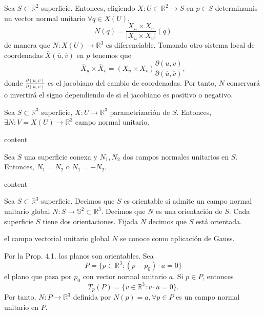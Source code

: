 \begin{note}
  Sea $S \subset \mathbb{R}^{2}$ superficie. Entonces, eligiendo $X : U \subset \mathbb{R}^{2} \to S$ en $p \in S$ determinamis un vector normal unitario $\forall q \in X(U)$,
  \[ 
    N(q) = \frac{X_{u} \times X_{v}}{| X_{u} \times X_{v} |}(q)
  \] 
  de manera que $N : X(U) \to \mathbb{R}^{3}$ es diferenciable. Tomando otro sistema local de coordenadas $\overline{X}(\overline{u}, \overline{v})$ en $p$ tenemos que
  \[ 
    \overline{X}_{\overline{u}} \times \overline{X}_{\overline{v}} = (X_{u} \times X_{v}) \frac{\partial{(u, v)}}{\partial{(\overline{u}, \overline{v})}},
  \] 
  donde $\frac{\partial{(u, v)}}{\partial{(\overline{u}, \overline{v})}}$ es el jacobiano del cambio de coordenadas. Por tanto, $N$ conservará o invertirá el signo dependiendo de si el jacobiano es positivo o negativo.
\end{note}

\begin{prop}
  Sea $S \subset \mathbb{R}^{3}$ superficie, $X : U \to \mathbb{R}^{3}$ parametrización de $S$. Entonces, $\exists N : V = X(U) \to \mathbb{R}^{3}$ campo normal unitario.
\end{prop}

\begin{dem}
  content
\end{dem}

\begin{lem}
  Sea $S$ una superficie conexa y $N_{1}, N_{2}$ dos campos normales unitarios en $S$. Entonces, $N_{1} = N_{2}$ o $N_{1} = -N_{2}$.
\end{lem}

\begin{dem}
  content
\end{dem}

\begin{defn}
  Sea $S \subset \mathbb{R}^{3}$ superficie. Decimos que $S$ es orientable si admite un campo normal unitario global $N : S \to \mathbb{S}^{2} \subset \mathbb{R}^{3}$. Decimos que $N$ es una orientación de $S$. Cada superficie $S$ tiene dos orientaciones. Fijada $N$ decimos que $S$ está orientada.
\end{defn}

\begin{obs}
  el campo vectorial unitario global $N$ se conoce como aplicación de Gauss.
\end{obs}

\begin{ejm}[Plano]
  Por la Prop. 4.1. los planos son orientables. Sea
  \[
    P = \{  p \in \mathbb{R}^{3} : (p - p_{0}) \cdot a = 0 \}
  \]
  el plano que pasa por $p_{0}$ con vector normal unitario $a$. Si $p \in P$, entonces
  \[ 
    T_{p}(P) = \{ v \in \mathbb{R}^{3} : v \cdot a = 0 \} .
  \] 
  Por tanto, $N : P \to \mathbb{R}^{3}$ definida por $ N(p) = a, \forall p \in P$ es un campo normal unitario en $P$.
\end{ejm}

